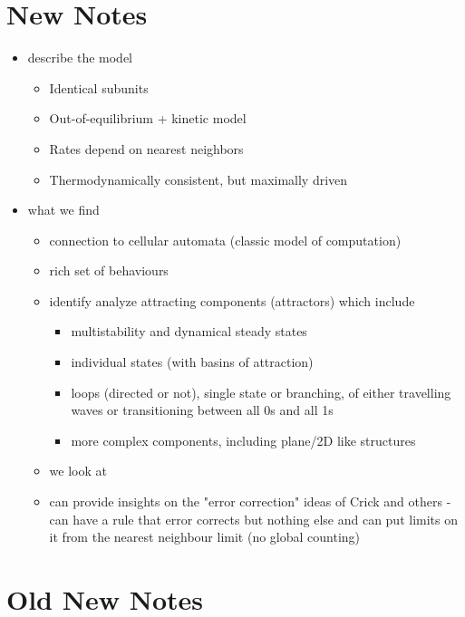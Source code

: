 \documentclass[11pt]{article}
\begin{document}
\section{New Notes}
\begin{itemize}
	\item describe the model
	      \begin{itemize}
		      \item Identical subunits
		      \item Out-of-equilibrium + kinetic model
		      \item Rates depend on nearest neighbors
		      \item Thermodynamically consistent, but maximally driven
	      \end{itemize}
	\item what we find
	      \begin{itemize}
		      \item connection to cellular automata (classic model of computation)
		      \item rich set of behaviours
		      \item identify analyze attracting components (attractors) which include
		            \begin{itemize}
			            \item multistability and dynamical steady states
			            \item individual states (with basins of attraction)
			            \item loops (directed or not), single state or branching, of either travelling waves or transitioning between all 0s and all 1s
			            \item more complex components, including plane/2D like structures
		            \end{itemize}
		      \item we look at
              \item can provide insights on the "error correction" ideas of Crick and others - can have a rule that error corrects but nothing else and can put limits on it from the nearest neighbour limit (no global counting)
	      \end{itemize}
\end{itemize}

\newpage
\section{Old New Notes}
\end{document}
